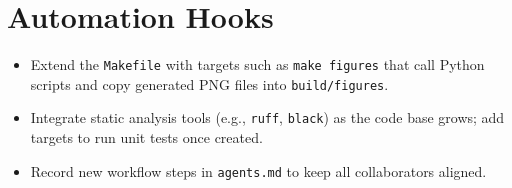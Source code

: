 \section{Automation Hooks}
\begin{itemize}[leftmargin=*]
    \item Extend the \texttt{Makefile} with targets such as \texttt{make figures} that call Python scripts and copy generated PNG files into \texttt{build/figures}.
    \item Integrate static analysis tools (e.g., \texttt{ruff}, \texttt{black}) as the code base grows; add targets to run unit tests once created.
    \item Record new workflow steps in \texttt{agents.md} to keep all collaborators aligned.
\end{itemize}
